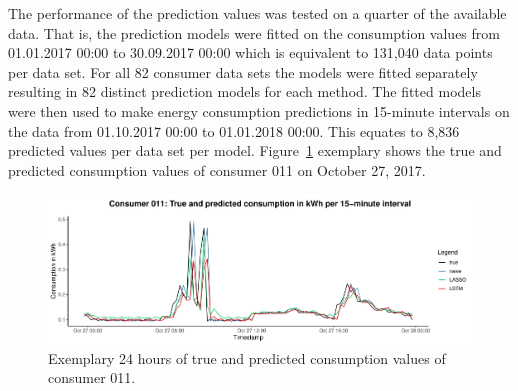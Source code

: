 The performance of the prediction values was tested on a quarter of the available data. That is, the prediction models were fitted on the consumption values from 01.01.2017 00:00 to 30.09.2017 00:00 which is equivalent to 131,040 data points per data set. For all 82 consumer data sets the models were fitted separately resulting in 82 distinct prediction models for each method. The fitted models were then used to make energy consumption predictions in 15-minute intervals on the data from 01.10.2017 00:00 to 01.01.2018 00:00. This equates to 8,836 predicted values per data set per model. Figure~\ref{Fig:glimpse_predcons} exemplary shows the true and predicted consumption values of consumer 011 on October 27, 2017. 
%
\begin{figure}[htbp]
    \centering
    \includegraphics[width=\textwidth]{thesis/graphs/evaluation/c011_pred_cons.pdf}
    \caption[Exemplary 24 hours of true and predicted consumption values]{Exemplary 24 hours of true and predicted consumption values of consumer 011. \quantnet\href{}{}}
    \label{Fig:glimpse_predcons}
\end{figure}




